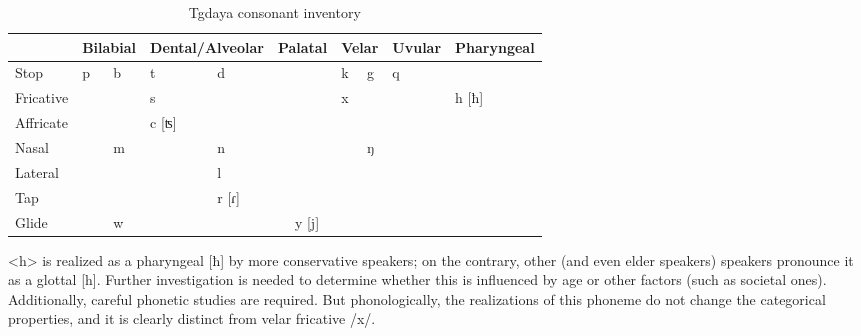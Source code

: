 \begin{table}[!htbp]
\centering
\caption{Tgdaya consonant inventory\\}
\label{tab:tgC}
\begin{tabular}{l|ll|ll|ll|ll|ll|ll}
\hline
                    & \multicolumn{2}{c|}{Bilabial} & \multicolumn{2}{c|}{Dental/Alveolar} & \multicolumn{2}{c|}{Palatal} & \multicolumn{2}{c|}{Velar} & \multicolumn{2}{c|}{Uvular} & \multicolumn{2}{c}{Pharyngeal} \\ \hline
Stop                & p            & b           & t               & d               &             &               & k          & g          & q            &            &                 &              \\
Fricative           &               &              & s               &                  &             &               & x          &             &               &            & h [ħ]             &              \\
Affricate           &               &              & c [ʦ]              &                  &             &               &             &             &               &            &                 &              \\
Nasal               &               & m           &                  & n               &             &               &             & ŋ          &               &            &                 &              \\
Lateral &               &              &                  & l               &             &               &             &             &               &            &                 &              \\
Tap                 &               &              &                  & r [ɾ]              &             &               &             &             &               &            &                 &              \\
Glide               &               & w           &                  &                  &             & y [j]           &             &             &               &            &                 &              \\ \hline
\end{tabular}
\end{table}

<h> is realized as a pharyngeal [ħ] by more conservative speakers; on the contrary, other (and even elder speakers) speakers pronounce it as a glottal [h]. Further investigation is needed to determine whether this is influenced by age or other factors (such as societal ones). Additionally, careful phonetic studies are required. But phonologically, the realizations of this phoneme do not change the categorical properties, and it is clearly distinct from velar fricative /x/.

